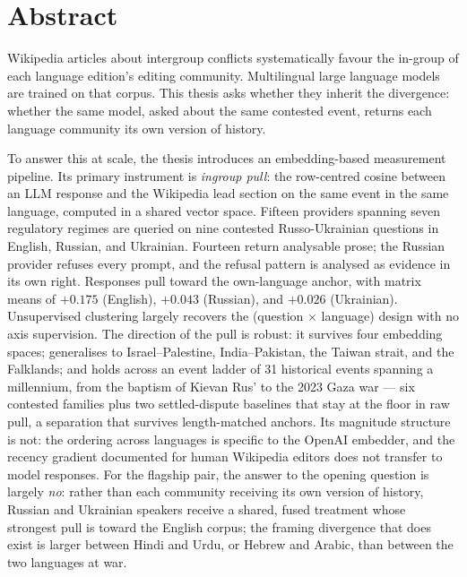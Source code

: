 
 \setcounter{tocdepth}{2}
 \tableofcontents
 \cleardoublepage


\chapter*{Abstract}

Wikipedia articles about intergroup conflicts systematically favour
the in-group of each language edition's editing community.
Multilingual large language models are trained on that corpus. This
thesis asks whether they inherit the divergence: whether the same
model, asked about the same contested event, returns each language
community its own version of history.

To answer this at scale, the thesis introduces an embedding-based
measurement pipeline. Its primary instrument is \emph{ingroup
pull}: the row-centred cosine between an LLM response and the
Wikipedia lead section on the same event in the same language,
computed in a shared vector space. Fifteen providers spanning seven
regulatory regimes are queried on nine contested Russo-Ukrainian
questions in English, Russian, and Ukrainian. Fourteen return
analysable prose; the Russian provider refuses every prompt, and
the refusal pattern is analysed as evidence in its own right.
Responses pull toward the own-language anchor, with matrix means of
$+0.175$ (English), $+0.043$ (Russian), and $+0.026$ (Ukrainian).
Unsupervised clustering largely recovers the (question $\times$
language) design with no axis supervision. The direction of the pull is
robust: it survives four embedding spaces; generalises to
Israel--Palestine, India--Pakistan, the Taiwan strait, and the
Falklands; and holds across an event ladder of 31
historical events spanning a millennium, from the baptism of
Kievan Rus' to the 2023 Gaza war --- six contested families plus
two settled-dispute baselines that stay at the floor in raw pull,
a separation that survives length-matched anchors. Its magnitude
structure
is not: the ordering across languages is specific to the OpenAI
embedder, and the recency gradient documented for human Wikipedia
editors does not transfer to model responses. For the flagship
pair, the answer to the opening question is largely \emph{no}:
rather than each community receiving its own version of history,
Russian and Ukrainian speakers receive a shared, fused treatment
whose strongest pull is toward the English corpus; the framing
divergence that does exist is larger between Hindi and Urdu, or
Hebrew and Arabic, than between the two languages at war.

